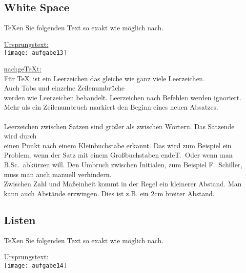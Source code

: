 \pagebreak
\subsection{White Space}				%
\normalsize
\begin{aufgabe}
\TeX en Sie folgenden Text so exakt wie m\"oglich nach.	
\end{aufgabe}

\noindent \underline{Ursprungstext:} \\
\noindent\texttt{[image: aufgabe13]}

\noindent \underline{nachge\TeX t:}\\
\normalsize
\onehalfspacing
\indent Für \TeX \ ist ein Leerzeichen das gleiche wie ganz viele \hfill Leerzeichen.\\
\setlength{\parindent}{12mm} \indent 
Auch Tabs und einzelne Zeilenumbrüche\\
werden wie Leerzeichen behandelt. Leerzeichen nach Befehlen werden ignoriert.
Mehr als ein Zeilenumbruch markiert den Beginn eines neuen Absatzes.\\
\\
Leerzeichen zwischen Sätzen sind größer als zwischen Wörtern. Das Satzende wird durch\\
einen Punkt nach einem Kleinbuchstabe erkannt.\linebreak
Das wird zum Beispiel ein Problem, wenn der Satz mit einem Großbuchstaben endeT.\
Oder wenn man B.Sc.\ abkürzen will.
Den Umbruch zwischen Initialen, zum Beispiel F.~Schiller, muss man auch manuell verhindern.\\
\hspace*{4mm} Zwischen Zahl und Maßeinheit kommt in der Regel ein kleinerer Abstand.
Man kann auch Abstände erzwingen.
Dies ist z.B. ein 2cm breiter \hspace{2cm} Abstand.

\pagebreak
\subsection{Listen}					%
\begin{aufgabe}
\TeX en Sie folgenden Text so exakt wie m\"oglich nach.	
\end{aufgabe}

\noindent \underline{Ursprungstext:} \\
\texttt{[image: aufgabe14]}

